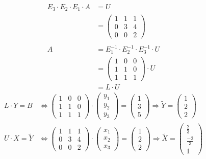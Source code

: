 \documentclass[lineaire_algebra_oplossingen.tex]{subfiles}
\begin{document}
\begin{align*}
E_3 \cdot E_2 \cdot E_1 \cdot A
&=U \\
&=
\begin{pmatrix}
1 & 1 & 1\\
0 & 3 & 4\\
0 & 0 & 2
\end{pmatrix} \\ \\
A
&= E_1^{-1} \cdot E_2^{-1} \cdot E_3^{-1} \cdot U \\
&=
\begin{pmatrix}
1 & 0 & 0\\
1 & 1 & 0\\
1 & 1 & 1
\end{pmatrix}
\cdot U \\
&= L \cdot U
\end{align*}
\begin{align*}
L \cdot Y = B
&\Longleftrightarrow
\begin{pmatrix}
1 & 0 & 0\\
1 & 1 & 0\\
1 & 1 & 1
\end{pmatrix}
\cdot
\begin{pmatrix}
y_1\\
y_2\\
y_3
\end{pmatrix}
=
\begin{pmatrix}
1\\
3\\
5
\end{pmatrix}
\Longrightarrow
\tilde{Y} = 
\begin{pmatrix}
1 \\
2 \\
2 
\end{pmatrix} \\
U \cdot X = \tilde{Y}
&\Longleftrightarrow
\begin{pmatrix}
1 & 1 & 1\\
0 & 3 & 4\\
0 & 0 & 2
\end{pmatrix}
\cdot
\begin{pmatrix}
x_1\\
x_2\\
x_3
\end{pmatrix}
=
\begin{pmatrix}
1\\
2\\
2
\end{pmatrix}
\Longrightarrow
\tilde{X} = 
\begin{pmatrix}
\frac{2}{3} \\
\frac{-2}{3} \\
1 
\end{pmatrix}
\end{align*}
\end{document}
